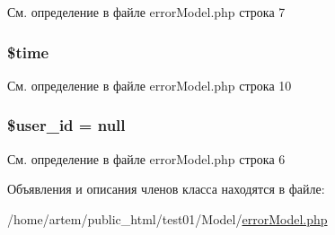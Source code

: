 См. определение в файле error\-Model.\-php строка 7

\hypertarget{classerror_model_a78db1a0602e3b6ac1d9a1b5ec103c160}{
\subsubsection[{\$time}]{\setlength{\rightskip}{0pt plus 5cm}\$time}}\label{classerror_model_a78db1a0602e3b6ac1d9a1b5ec103c160}


См. определение в файле error\-Model.\-php строка 10

\hypertarget{classerror_model_af0fcd925f00973e32f7214859dfb3c6b}{
\subsubsection[{\$user\-\_\-id}]{\setlength{\rightskip}{0pt plus 5cm}\$user\-\_\-id = null}}\label{classerror_model_af0fcd925f00973e32f7214859dfb3c6b}


См. определение в файле error\-Model.\-php строка 6



Объявления и описания членов класса находятся в файле\-:\begin{DoxyCompactItemize}
\item 
/home/artem/public\-\_\-html/test01/\-Model/\hyperlink{error_model_8php}{error\-Model.\-php}\end{DoxyCompactItemize}

